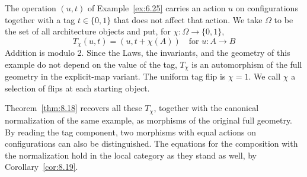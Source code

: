 \begin{example}\label{ex:8.20}

The operation $(u,t)$ of Example~\ref{ex:6.25} carries an action $u$ on configurations
together with a tag $t\in\{0,1\}$ that does not affect that action.
We take $\Omega$ to be the set of all architecture objects and put, for
$\chi:\Omega\to\{0,1\}$,
\begin{equation*}
T_\chi(u,t)=(u,t+\chi(A))
\quad\text{for }u:A\to B
\tag{8.19}\label{eq:8.19}
\end{equation*}
Addition is modulo 2.
Since the Laws, the invariants, and the geometry of this example do not depend on the value of
the tag, $T_\chi$ is an automorphism of the full geometry in the explicit-map variant.
The uniform tag flip is $\chi=1$.
We call $\chi$ a selection of flips at each starting object.

Theorem~\ref{thm:8.18} recovers all these $T_\chi$, together with the canonical normalization
of the same example, as morphisms of the original full geometry.
By reading the tag component, two morphisms with equal actions on configurations can also be
distinguished.
The equations for the composition with the normalization hold in the local category as they
stand as well, by Corollary~\ref{cor:8.19}.

\end{example}


